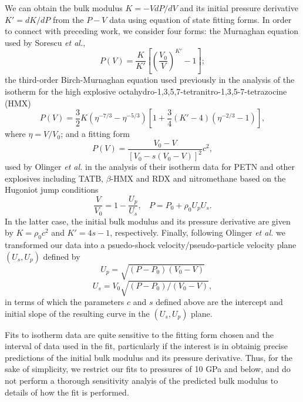 \documentclass[prb,aps,nobibnotes,twocolumn,doublespace,twocolumngrid,superbib]{revtex4}
\begin{document}
We can obtain the bulk modulus $K=-VdP/dV$ and its initial pressure
derivative $K'=dK/dP$ from the $P-V$ data using equation of state 
fitting forms.  In order to connect with preceding work, we consider
four forms: the Murnaghan equation\cite{Murnaghan_1951}
used by Sorescu {\it et al.},
\begin{equation}
P(V)=\frac{K}{K'}\left[\left(\frac{V_0}{V}\right)^{K'}-1\right];
\label{eq:Murnaghan}
\end{equation}
the third-order Birch-Murnaghan equation\cite{Poirier_1991} 
used previously in the analysis of the isotherm for the
high explosive 
octahydro-1,3,5,7-tetranitro-1,3,5-7-tetrazocine 
(HMX)\cite{Yoo_1999v111,Menikoff_2001v21,Sewell_2003}
\begin{equation}
P(V)=\frac{3}{2}K(\eta^{-7/3}-\eta^{-5/3})
     [1+\frac{3}{4}(K' -4)(\eta^{-2/3}-1)],
\end{equation}
where $\eta=V/V_0$; and a fitting form
\begin{equation}
P(V)=\frac{V_0-V}{[V_0-s(V_0-V)]^2}c^2,
\end{equation}
used by Olinger {\it et al.}\/ in the analysis of their isotherm data for
PETN\cite{Olinger_1975v62,Olinger_1976} and other explosives including
TATB,\cite{Olinger_1976} $\beta$-HMX and RDX\cite{Olinger_1978}
and nitromethane\cite{Yarger_1986v85} 
based on the Hugoniot jump conditions
\[ \frac{V}{V_0}=1-\frac{U_p}{U_s}, \ \ \ \  P=P_0+\rho_0U_pU_s. \]
In the latter case, the initial bulk modulus and its pressure derivative
are given by $K=\rho_0c^2$ and $K'=4s-1$, respectively.  Finally,
following Olinger {\it et al.}\/ we transformed our data into a psuedo-shock
velocity/pseudo-particle velocity plane $(U_s,U_p)$ defined by
\begin{equation}
U_p=\sqrt{(P-P_0)(V_0-V)}
\end{equation}
\begin{equation}
U_s=V_0\sqrt{(P-P_0)/(V_0-V)},
\end{equation}
in terms of which the parameters $c$ and $s$ defined above are the
intercept and initial slope of the resulting curve in the $(U_s,U_p)$
plane.

Fits to isotherm data are quite sensitive to the fitting form chosen
and the interval of data used in the fit, particularly if the interest
is in obtainig precise predictions of the initial bulk modulus and
its pressure derivative.  Thus, for the sake of simplicity,
we restrict our fits to pressures of 10 GPa and
below, and do not perform a thorough sensitivity analyis of the
predicted bulk modulus to details of how the fit is performed.
\end{document}
